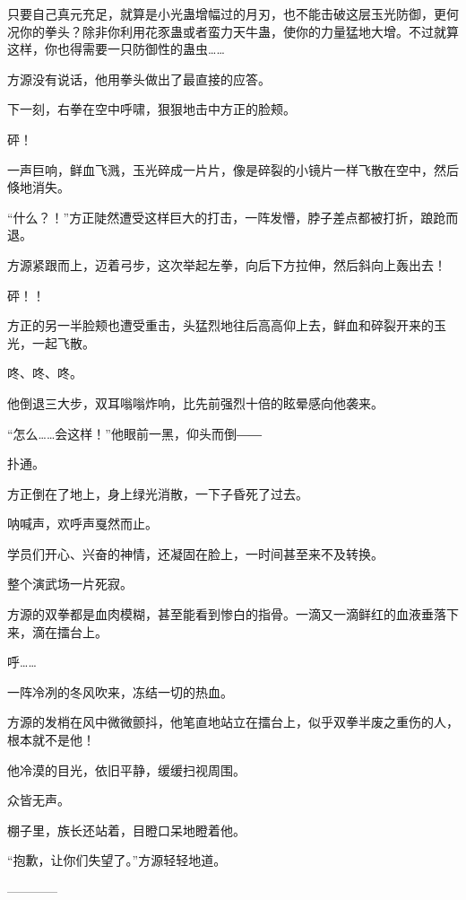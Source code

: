 \begin{this_body}
只要自己真元充足，就算是小光蛊增幅过的月刃，也不能击破这层玉光防御，更何况你的拳头？除非你利用花豕蛊或者蛮力天牛蛊，使你的力量猛地大增。不过就算这样，你也得需要一只防御性的蛊虫……

方源没有说话，他用拳头做出了最直接的应答。

下一刻，右拳在空中呼啸，狠狠地击中方正的脸颊。

砰！

一声巨响，鲜血飞溅，玉光碎成一片片，像是碎裂的小镜片一样飞散在空中，然后倏地消失。

“什么？！”方正陡然遭受这样巨大的打击，一阵发懵，脖子差点都被打折，踉跄而退。

方源紧跟而上，迈着弓步，这次举起左拳，向后下方拉伸，然后斜向上轰出去！

砰！！

方正的另一半脸颊也遭受重击，头猛烈地往后高高仰上去，鲜血和碎裂开来的玉光，一起飞散。

咚、咚、咚。

他倒退三大步，双耳嗡嗡炸响，比先前强烈十倍的眩晕感向他袭来。

“怎么……会这样！”他眼前一黑，仰头而倒――

扑通。

方正倒在了地上，身上绿光消散，一下子昏死了过去。

呐喊声，欢呼声戛然而止。

学员们开心、兴奋的神情，还凝固在脸上，一时间甚至来不及转换。

整个演武场一片死寂。

方源的双拳都是血肉模糊，甚至能看到惨白的指骨。一滴又一滴鲜红的血液垂落下来，滴在擂台上。

呼……

一阵冷冽的冬风吹来，冻结一切的热血。

方源的发梢在风中微微颤抖，他笔直地站立在擂台上，似乎双拳半废之重伤的人，根本就不是他！

他冷漠的目光，依旧平静，缓缓扫视周围。

众皆无声。

棚子里，族长还站着，目瞪口呆地瞪着他。

“抱歉，让你们失望了。”方源轻轻地道。

------------

\end{this_body}

